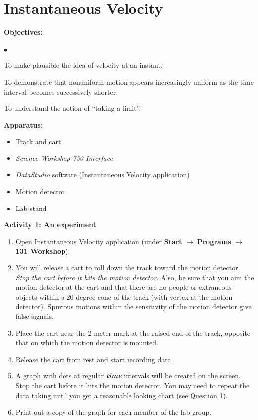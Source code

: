 
\section{Instantaneous Velocity}

\makelabheader %

{\noindent \bf Objectives:} \begin{list}{$\bullet$}{\itemsep0pt }

\item To make plausible the idea of velocity at an instant. \item To demonstrate that nonuniform motion appears increasingly uniform as the time interval becomes successively shorter. \item To understand the notion of ``taking a limit''.

\end{list}

\textbf{Apparatus:}

\begin{itemize}
\item Track and cart 
\item \textit{Science Workshop 750 Interface}
\item \textit{DataStudio} software (Instantaneous Velocity application)
\item Motion detector
\item Lab stand
\end{itemize}
{\noindent \bf Activity 1: An experiment} \begin{enumerate}

\item Open Instantaneous Velocity application (under
\textbf{Start} $\rightarrow$
\textbf{Programs} $\rightarrow$ \textbf{131 Workshop}).

\item You will release a cart to roll down the track toward the motion
detector. {\it Stop the cart before it hits the motion detector}. Also, be sure
that you aim the motion detector at the cart and that there are no people or
extraneous objects within a 20 degree cone of the track (with vertex
at the motion detector). Spurious motions within the sensitivity of
the motion detector give false signals.

\item Place the cart near the 2-meter mark at the raised end of the track, opposite that on which the motion detector is mounted.

\item Release the cart from rest and start recording data.

\item A graph with dots at regular {\bf \it time} intervals will be created on the screen. Stop the cart before it hits the motion detector. You may need to repeat the data taking until you get a reasonable looking chart (see Question 1).

\item Print out a copy of the graph for each member of the lab group.

\end{enumerate}

